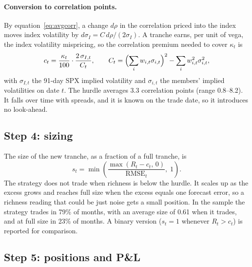 \paragraph{Conversion to correlation points.} By equation~\eqref{eq:avgcorr}, a change $d\rho$ in the correlation priced into the index moves index volatility by $d\sigma_I = C\,d\rho/(2\sigma_I)$. A tranche earns, per unit of vega, the index volatility mispricing, so the correlation premium needed to cover $\kappa_t$ is
\begin{equation}\label{eq:hurdle}
  c_t = \frac{\kappa_t}{100}\cdot\frac{2\,\sigma_{I,t}}{C_t},
  \qquad C_t = \Bigl(\sum_i w_{i,t}\sigma_{i,t}\Bigr)^2 - \sum_i w_{i,t}^2\sigma_{i,t}^2 ,
\end{equation}
with $\sigma_{I,t}$ the 91-day SPX implied volatility and $\sigma_{i,t}$ the members' implied volatilities on date $t$. The hurdle averages 3.3 correlation points (range 0.8--8.2). It falls over time with spreads, and it is known on the trade date, so it introduces no look-ahead.

\subsection{Step 4: sizing}

The size of the new tranche, as a fraction of a full tranche, is
\begin{equation}\label{eq:size}
  s_t = \min\left( \frac{\max(R_t - c_t,\, 0)}{\mathrm{RMSE}_t},\; 1 \right).
\end{equation}
The strategy does not trade when richness is below the hurdle. It scales up as the excess grows and reaches full size when the excess equals one forecast error, so a richness reading that could be just noise gets a small position. In the sample the strategy trades in 79\% of months, with an average size of 0.61 when it trades, and at full size in 23\% of months. A binary version ($s_t = 1$ whenever $R_t > c_t$) is reported for comparison.

\subsection{Step 5: positions and P\&L}

